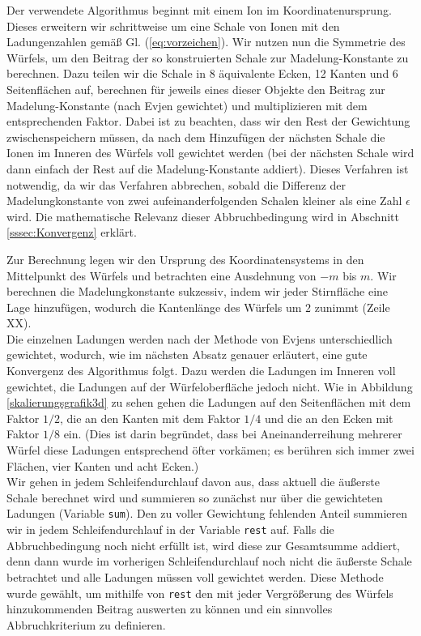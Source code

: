 \documentclass[10pt,a4paper]{article}
\begin{document}
Der verwendete Algorithmus beginnt mit einem Ion im Koordinatenursprung. Dieses
erweitern wir schrittweise um eine Schale von Ionen mit den Ladungenzahlen gemäß
Gl. (\ref{eq:vorzeichen}). Wir nutzen nun die Symmetrie des Würfels, um den Beitrag
der so konstruierten Schale zur Madelung-Konstante zu berechnen. Dazu teilen wir die
Schale in 8 äquivalente Ecken, 12 Kanten und 6 Seitenflächen auf, berechnen für
jeweils eines dieser Objekte den Beitrag zur Madelung-Konstante (nach Evjen gewichtet)
und multiplizieren mit dem entsprechenden Faktor. Dabei ist zu beachten, dass wir
den Rest der Gewichtung zwischenspeichern müssen, da nach dem Hinzufügen der nächsten
Schale die Ionen im Inneren des Würfels voll gewichtet werden (bei der nächsten Schale
wird dann einfach der Rest auf die Madelung-Konstante addiert). Dieses Verfahren ist notwendig, da wir das Verfahren abbrechen, sobald die Differenz der Madelungkonstante
von zwei aufeinanderfolgenden Schalen kleiner als eine Zahl $\epsilon$ wird. Die
mathematische Relevanz dieser Abbruchbedingung wird in Abschnitt \ref{sssec:Konvergenz}
erklärt.

Zur Berechnung legen wir den Ursprung des Koordinatensystems in den Mittelpunkt des
Würfels und betrachten eine Ausdehnung von $-m$ bis $m$.
Wir berechnen die Madelungkonstante sukzessiv, indem wir jeder Stirnfläche eine Lage
hinzufügen, wodurch die Kantenlänge des Würfels um $2$ zunimmt (Zeile XX).\\
Die einzelnen Ladungen werden nach der Methode von
Evjens \cite{Evjen} unterschiedlich gewichtet, wodurch, wie im nächsten Absatz genauer
erläutert, eine gute Konvergenz des Algorithmus folgt. Dazu werden die Ladungen im
Inneren voll gewichtet, die Ladungen auf der Würfeloberfläche jedoch nicht. Wie in
Abbildung \ref{skalierungsgrafik3d} zu sehen gehen die Ladungen auf den Seitenflächen mit
dem Faktor $1/2$, die an den Kanten mit dem Faktor $1/4$ und die an den Ecken mit Faktor
$1/8$ ein. (Dies ist darin begründet, dass bei Aneinanderreihung mehrerer Würfel diese
Ladungen entsprechend öfter vorkämen; es berühren sich immer zwei Flächen, vier Kanten
und acht Ecken.)\\
Wir gehen in jedem Schleifendurchlauf davon aus, dass aktuell die äußerste Schale berechnet
wird und summieren so zunächst nur über die gewichteten Ladungen (Variable \texttt{sum}).
Den zu voller Gewichtung fehlenden Anteil summieren wir in jedem Schleifendurchlauf in der Variable
\texttt{rest} auf. Falls die Abbruchbedingung noch nicht erfüllt ist, wird diese zur
Gesamtsumme addiert, denn dann wurde im vorherigen Schleifendurchlauf noch nicht die
äußerste Schale betrachtet und alle Ladungen müssen voll gewichtet werden. Diese Methode
wurde gewählt, um mithilfe von \texttt{rest} den mit jeder Vergrößerung des Würfels
hinzukommenden Beitrag auswerten zu können und ein sinnvolles Abbruchkriterium zu definieren.\\
\end{document}
